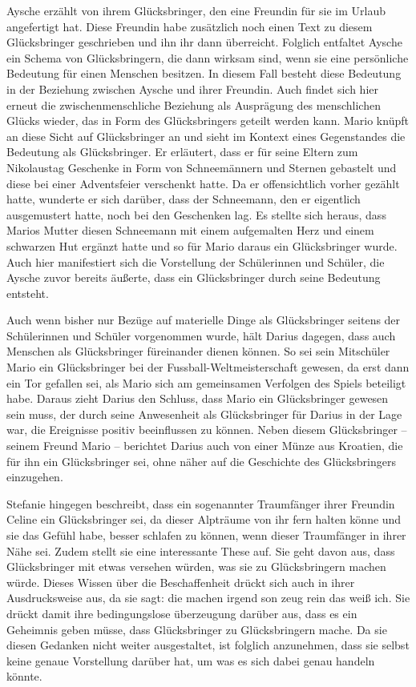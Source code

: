 Aysche erzählt von ihrem Glücksbringer, den eine Freundin für sie im Urlaub angefertigt hat. 
Diese Freundin habe zusätzlich noch einen Text zu diesem Glücksbringer geschrieben und ihn ihr dann überreicht. 
Folglich entfaltet Aysche ein Schema von Glücksbringern, die dann wirksam sind, wenn sie eine persönliche Bedeutung für einen Menschen besitzen. 
In diesem Fall besteht diese Bedeutung in der Beziehung zwischen Aysche und ihrer Freundin. 
Auch findet sich hier erneut die zwischenmenschliche Beziehung als Ausprägung des menschlichen Glücks wieder, das in Form des Glücksbringers geteilt werden kann. 
Mario knüpft an diese Sicht auf Glücksbringer an und sieht im Kontext eines Gegenstandes die Bedeutung als Glücksbringer.
Er erläutert, dass er für seine Eltern zum Nikolaustag Geschenke in Form von Schneemännern und Sternen gebastelt und diese bei einer Adventsfeier verschenkt hatte. 
Da er offensichtlich vorher gezählt hatte, wunderte er sich darüber, dass der Schneemann, den er eigentlich ausgemustert hatte, noch bei den Geschenken lag. 
Es stellte sich heraus, dass Marios Mutter diesen Schneemann mit einem aufgemalten Herz und einem schwarzen Hut ergänzt hatte und so für Mario daraus ein Glücksbringer wurde. 
Auch hier manifestiert sich die Vorstellung der Schülerinnen und Schüler, die Aysche zuvor bereits äußerte, dass ein Glücksbringer durch seine Bedeutung entsteht.
	
Auch wenn bisher nur Bezüge auf materielle Dinge als Glücksbringer seitens der Schülerinnen und Schüler vorgenommen wurde, hält Darius dagegen, dass auch Menschen als Glücksbringer füreinander dienen können. 
So sei sein Mitschüler Mario ein Glücksbringer bei der Fussball-Weltmeisterschaft gewesen, da erst dann ein Tor gefallen sei, als Mario sich am gemeinsamen Verfolgen des Spiels beteiligt habe. 
Daraus zieht Darius den Schluss, dass Mario ein Glücksbringer gewesen sein muss, der durch seine Anwesenheit als Glücksbringer für Darius in der Lage war, die Ereignisse positiv beeinflussen zu können. 
Neben diesem Glücksbringer -- seinem Freund Mario -- berichtet Darius auch von einer Münze aus Kroatien, die für ihn ein Glücksbringer sei, ohne näher auf die Geschichte des Glücksbringers einzugehen. 

Stefanie hingegen beschreibt, dass ein sogenannter Traumfänger ihrer Freundin Celine ein Glücksbringer sei, da dieser Alpträume von ihr fern halten könne und sie das Gefühl habe, besser schlafen zu können, wenn dieser Traumfänger in ihrer Nähe sei. 
Zudem stellt sie eine interessante These auf. 
Sie geht davon aus, dass Glücksbringer mit etwas versehen würden, was sie zu Glücksbringern machen würde.
Dieses Wissen über die Beschaffenheit drückt sich auch in ihrer Ausdrucksweise aus, da sie sagt: \glqq die machen irgend son zeug rein das weiß ich.\grqq{} 
Sie drückt damit ihre bedingungslose überzeugung darüber aus, dass es ein Geheimnis geben müsse, dass Glücksbringer zu Glücksbringern mache. 
Da sie diesen Gedanken nicht weiter ausgestaltet, ist folglich anzunehmen, dass sie selbst keine genaue Vorstellung darüber hat, um was es sich dabei genau handeln könnte. 

